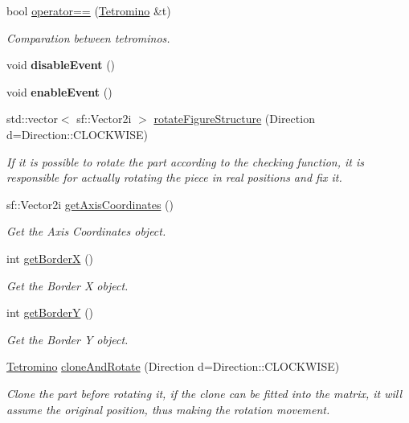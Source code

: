 \begin{DoxyCompactItemize}
bool \hyperlink{classTetromino_a1fb3c6bd848e94e099f74b7267b09bb2}{operator==} (\hyperlink{classTetromino}{Tetromino} \&t)
\begin{DoxyCompactList}\small\item\em Comparation between tetrominos. \end{DoxyCompactList}\item 
\mbox{\label{classTetromino_a1b3d40f3fbe6707ade8c4ceabe0b470f}} 
void {\bfseries disable\+Event} ()
\item 
\mbox{\label{classTetromino_a7a8183d917efd18738fc83ba86cfb010}} 
void {\bfseries enable\+Event} ()
\item 
std\+::vector$<$ sf\+::\+Vector2i $>$ \hyperlink{classTetromino_ae067d0f05219f03a6b7f8e15e3cc67d0}{rotate\+Figure\+Structure} (Direction d=Direction\+::\+C\+L\+O\+C\+K\+W\+I\+SE)
\begin{DoxyCompactList}\small\item\em If it is possible to rotate the part according to the checking function, it is responsible for actually rotating the piece in real positions and fix it. \end{DoxyCompactList}\item 
sf\+::\+Vector2i \hyperlink{classTetromino_a6bcb8f93c3259bfba0bfa380c900af8a}{get\+Axis\+Coordinates} ()
\begin{DoxyCompactList}\small\item\em Get the Axis Coordinates object. \end{DoxyCompactList}\item 
int \hyperlink{classTetromino_aceb82d83a9a0c1d6825855e46c386b20}{get\+BorderX} ()
\begin{DoxyCompactList}\small\item\em Get the Border X object. \end{DoxyCompactList}\item 
int \hyperlink{classTetromino_a9ab14cf7ce0a87d9102c6b04f6f2f995}{get\+BorderY} ()
\begin{DoxyCompactList}\small\item\em Get the Border Y object. \end{DoxyCompactList}\item 
\hyperlink{classTetromino}{Tetromino} \hyperlink{classTetromino_aaf9f42f0c7432becc4e5f8fe47575f1b}{clone\+And\+Rotate} (Direction d=Direction\+::\+C\+L\+O\+C\+K\+W\+I\+SE)
\begin{DoxyCompactList}\small\item\em Clone the part before rotating it, if the clone can be fitted into the matrix, it will assume the original position, thus making the rotation movement. \end{DoxyCompactList}\item 

\end{DoxyCompactItemize}
